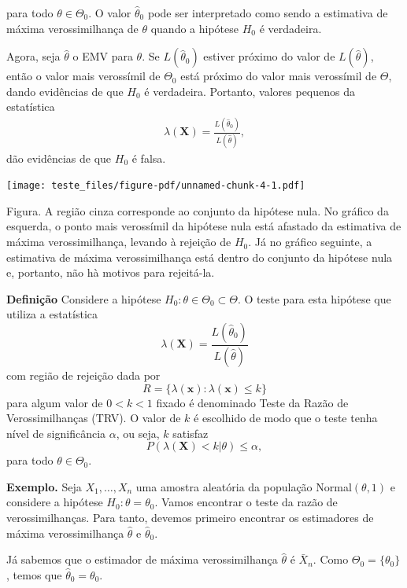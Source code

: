 \documentclass[
  letterpaper,
  DIV=11,
  numbers=noendperiod]{scrartcl}
\begin{document}
para todo \(\theta\in\Theta_0\). O valor \(\hat{\theta}_0\) pode ser
interpretado como sendo a estimativa de máxima verossimilhança de
\(\theta\) quando a hipótese \(H_0\) é verdadeira.

Agora, seja \(\hat{\theta}\) o EMV para \(\theta\). Se
\(L(\hat{\theta}_0)\) estiver próximo do valor de \(L(\hat{\theta})\),
então o valor mais verossímil de \(\Theta_0\) está próximo do valor mais
verossímil de \(\Theta\), dando evidências de que \(H_0\) é verdadeira.
Portanto, valores pequenos da estatística \[\begin{align}
\lambda(\textbf{X})=\frac{L(\hat{\theta}_0)}{L(\hat{\theta})},
\end{align}\] dão evidências de que \(H_0\) é falsa.

\label{fig}
\texttt{[image: teste\_files/figure-pdf/unnamed-chunk-4-1.pdf]}

Figura. A região cinza corresponde ao conjunto da hipótese nula. No
gráfico da esquerda, o ponto mais verossímil da hipótese nula está
afastado da estimativa de máxima verossimilhança, levando à rejeição de
\(H_0\). Já no gráfico seguinte, a estimativa de máxima verossimilhança
está dentro do conjunto da hipótese nula e, portanto, não hà motivos
para rejeitá-la.

\textbf{Definição} Considere a hipótese
\(H_0:\theta\in\Theta_0\subset \Theta\). O teste para esta hipótese que
utiliza a estatística
\[\lambda(\textbf{X})=\frac{L(\hat{\theta}_0)}{L(\hat{\theta})}\] com
região de rejeição dada por
\[R=\{ \lambda(\textbf{x}): \lambda(\textbf{x})\leq k \}\] para algum
valor de \(0<k<1\) fixado é denominado Teste da Razão de
Verossimilhanças (TRV). O valor de \(k\) é escolhido de modo que o teste
tenha nível de significância \(\alpha\), ou seja, \(k\) satisfaz
\[ P(\lambda(\textbf{X})<k|\theta)\leq \alpha,\] para todo
\(\theta\in\Theta_0\).

\textbf{Exemplo.} Seja \(X_1,\ldots,X_n\) uma amostra aleatória da
população Normal\((\theta,1)\) e considere a hipótese
\(H_0:\theta=\theta_0\). Vamos encontrar o teste da razão de
verossimilhanças. Para tanto, devemos primeiro encontrar os estimadores
de máxima verossimilhança \(\hat{\theta}\) e \(\hat{\theta}_0\).

Já sabemos que o estimador de máxima verossimilhança \(\hat{\theta}\) é
\(\bar{X}_n\). Como \(\Theta_0=\{\theta_0\}\), temos que
\(\hat{\theta}_0=\theta_0\).
\end{document}
